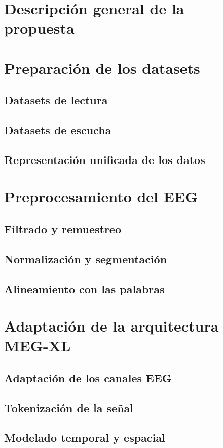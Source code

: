 \documentclass[11pt,spanish,listoffigures,listoftables]{tfgetsinf}
\begin{document}
\section{Descripción general de la propuesta}

\section{Preparación de los datasets}
\subsection{Datasets de lectura}
\subsection{Datasets de escucha}
\subsection{Representación unificada de los datos}

\section{Preprocesamiento del EEG}
\subsection{Filtrado y remuestreo}
\subsection{Normalización y segmentación}
\subsection{Alineamiento con las palabras}

\section{Adaptación de la arquitectura MEG-XL}
\subsection{Adaptación de los canales EEG}
\subsection{Tokenización de la señal}
\subsection{Modelado temporal y espacial}
\end{document}
